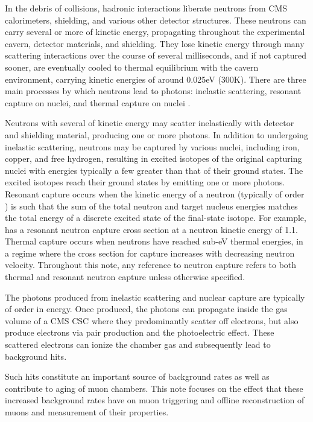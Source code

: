 In the debris of \pp collisions, hadronic interactions liberate neutrons from CMS calorimeters, shielding, and various other detector structures. These neutrons can carry several \GeVns or more of kinetic energy, propagating throughout the experimental cavern, detector materials, and shielding. They lose kinetic energy through many scattering interactions over the course of several milliseconds, and if not captured sooner, are eventually cooled to thermal equilibrium with the cavern environment, carrying kinetic energies of around 0.025\unit{eV} (300\unit{K}). There are three main processes by which neutrons lead to photons: inelastic scattering, resonant capture on nuclei, and thermal capture on nuclei \cite{Kopecky:1997}.

Neutrons with several \MeVns of kinetic energy may scatter inelastically with detector and shielding material, producing one or more photons. In addition to undergoing inelastic scattering, neutrons may be captured by various nuclei, including iron, copper, and free hydrogen, resulting in excited isotopes of the original capturing nuclei with energies typically a few \MeVns greater than that of their ground states. The excited isotopes reach their ground states by emitting one or more photons. Resonant capture occurs when the kinetic energy of a neutron (typically of order \keVns) is such that the sum of the total neutron and target nucleus energies matches the total energy of a discrete excited state of the final-state isotope. For example,  has a resonant neutron capture cross section at a neutron kinetic energy of 1.1\keV \cite{Kopecky:1997}. Thermal capture occurs when neutrons have reached sub-eV thermal energies, in a regime where the cross section for capture increases with decreasing neutron velocity. Throughout this note, any reference to neutron capture refers to both thermal and resonant neutron capture unless otherwise specified. 

The photons produced from inelastic scattering and nuclear capture are typically of order \MeVns in energy. Once produced, the photons can propagate inside the gas volume of a CMS CSC where they predominantly scatter off electrons, but also produce electrons via pair production and the photoelectric effect. These scattered electrons can ionize the chamber gas and subsequently lead to background hits.

Such hits constitute an important source of background rates as well as contribute to aging of muon chambers. This note focuses on the effect that these increased background rates have on muon triggering and offline reconstruction of muons and measurement of their properties. 

